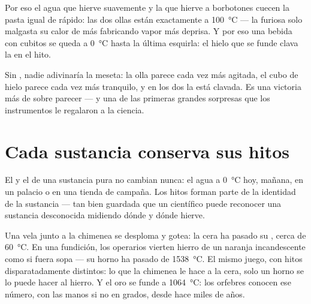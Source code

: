 \begin{example}\label{ex:g4:changes-of-state:kitchen}
Por eso el agua que hierve suavemente y la que hierve a borbotones
cuecen la pasta igual de rápido: las dos ollas están exactamente a
\qty{100}{\celsius} --- la furiosa solo malgasta su calor de más
fabricando vapor más deprisa. Y por eso una bebida con cubitos se
queda a \qty{0}{\celsius} hasta la última esquirla: el hielo que se
funde clava la  en el hito.
\end{example}

\begin{remark}\label{rem:g4:changes-of-state:invisible}
Sin , nadie adivinaría la meseta: la olla parece cada vez
más agitada, el cubo de hielo parece cada vez más tranquilo, y en los
dos la  está clavada. Es una victoria más de  sobre
parecer --- y una de las primeras grandes sorpresas que los
instrumentos le regalaron a la ciencia.
\end{remark}

\section{Cada sustancia conserva sus hitos}

\begin{proposition}\label{prop:g4:changes-of-state:identity}
El  y el  de una sustancia
pura no cambian nunca: el agua  a \qty{0}{\celsius} hoy,
mañana, en un palacio o en una tienda de campaña. Los hitos forman
parte de la identidad de la sustancia --- tan bien guardada que un
científico puede reconocer una sustancia desconocida midiendo dónde
 y dónde hierve.
\end{proposition}

\begin{example}\label{ex:g4:changes-of-state:foundry}
Una vela junto a la chimenea se desploma y gotea: la cera ha pasado su
, cerca de \qty{60}{\celsius}. En una fundición, los
operarios vierten hierro  de un naranja incandescente como si
fuera sopa --- su horno ha pasado de \qty{1538}{\celsius}. El mismo
juego, con hitos disparatadamente distintos: lo que la chimenea le
hace a la cera, solo un horno se lo puede hacer al hierro. Y el oro
se funde a \qty{1064}{\celsius}: los orfebres conocen ese número, con
las manos si no en grados, desde hace miles de años.
\end{example}

